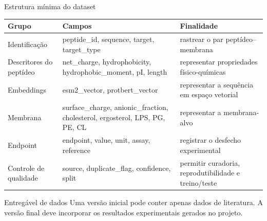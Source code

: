 \documentclass[aspectratio=169,10pt]{beamer}
\begin{document}
\begin{frame}{Estrutura mínima do dataset}
\scriptsize
\begin{tabular}{p{} p{} p{}}
\toprule
\textbf{Grupo} & \textbf{Campos} & \textbf{Finalidade} \\
\midrule
Identificação & peptide\_id, sequence, target, target\_type & rastrear o par peptídeo--membrana \\
Descritores do peptídeo & net\_charge, hydrophobicity, hydrophobic\_moment, pI, length & representar propriedades físico-químicas \\
Embeddings & esm2\_vector, protbert\_vector & representar a sequência em espaço vetorial \\
Membrana & surface\_charge, anionic\_fraction, cholesterol, ergosterol, LPS, PG, PE, CL & representar a membrana-alvo \\
Endpoint & endpoint, value, unit, assay, reference & registrar o desfecho experimental \\
Controle de qualidade & source, duplicate\_flag, confidence, split & permitir curadoria, reprodutibilidade e treino/teste \\
\bottomrule
\end{tabular}
\vspace{0.3cm}
\begin{block}{Entregável de dados}
Uma versão inicial pode conter apenas dados de literatura. A versão final deve incorporar os resultados experimentais gerados no projeto.
\end{block}
\end{frame}
\end{document}
